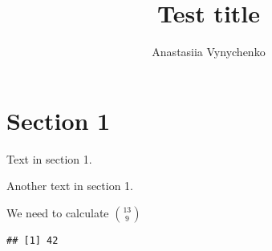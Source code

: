 \documentclass{article}\usepackage[]{graphicx}\usepackage[]{color}
\title{Test title}
\author{Anastasiia Vynychenko}
\makeatletter
\newenvironment{kframe}{%
 \def\at@end@of@kframe{}%
 \ifinner\ifhmode%
  \def\at@end@of@kframe{\end{minipage}}%
  \begin{minipage}{\columnwidth}%
 \fi\fi%
 \def\FrameCommand##1{\hskip\@totalleftmargin \hskip-\fboxsep
 \colorbox{shadecolor}{##1}\hskip-\fboxsep
     \hskip-\linewidth \hskip-\@totalleftmargin \hskip\columnwidth}%
 \MakeFramed {\advance\hsize-\width
   \@totalleftmargin\z@ \linewidth\hsize
   \@setminipage}}%
 {\par\unskip\endMakeFramed%
 \at@end@of@kframe}
\newenvironment{knitrout}{}{} %
\makeatother
\begin{document}
\maketitle
\tableofcontents

\newpage

\section{Section 1}

Text in section 1. 

Another text in section 1.

We need to calculate ${13 \choose 9}$

\begin{knitrout}
\color{fgcolor}\begin{kframe}
\begin{verbatim}
## [1] 42
\end{verbatim}
\end{kframe}
\end{knitrout}
\end{document}
